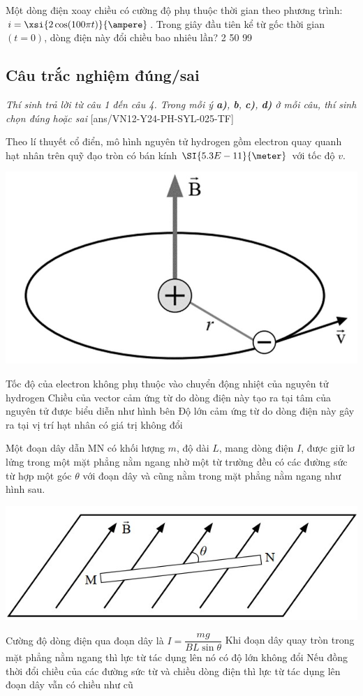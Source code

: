 \begin{ex}
	Một dòng điện xoay chiều có cường độ phụ thuộc thời gian theo phương trình: $i=\xsi{2 \cos (100 \pi t)}{\ampere}$. Trong giây đầu tiên kể từ gốc thời gian $(t=0)$, dòng điện này đổi chiều bao nhiêu lần?
	\choice
	{2}
	{50}
	{}
	{99}
	\loigiai{}
\end{ex}

\subsection{Câu trắc nghiệm đúng/sai}
\textit{Thí sinh trả lời từ câu 1 đến câu 4. Trong mỗi ý \textbf{a)}, \textbf{b}, \textbf{c)}, \textbf{d)} ở mỗi câu, thí sinh chọn đúng hoặc sai}
\setcounter{ex}{0}
[ans/VN12-Y24-PH-SYL-025-TF]
\begin{ex}
	Theo lí thuyết cổ điển, mô hình nguyên tử hydrogen gồm electron quay quanh hạt nhân trên quỹ đạo tròn có bán kính $\SI{5.3E-11}{\meter}$ với tốc độ $v$.	
	\begin{center}
		\includegraphics[width=0.3\linewidth]{figs/VN12-Y24-PH-SYL-025P-10}
	\end{center}
	{\True Tốc độ của electron không phụ thuộc vào chuyển động nhiệt của nguyên tử hydrogen}
	{Chiều của vector cảm ứng từ do dòng điện này tạo ra tại tâm của nguyên tử được biểu diễn như hình bên}
	{\True Độ lớn cảm ứng từ do dòng điện này gây ra tại vị trí hạt nhân có giá trị không đổi}
	\loigiai{}
\end{ex}
\begin{ex}
	Một đoạn dây dẫn MN có khối lượng $m$, độ dài $L$, mang dòng điện $I$, được giữ lơ lửng trong một mặt phẳng nằm ngang nhờ một từ trường đều có các đường sức từ hợp một góc $\theta$ với đoạn dây và cũng nằm trong mặt phẳng nằm ngang như hình sau.
	\begin{center}
		\includegraphics[width=0.4\linewidth]{figs/VN12-Y24-PH-SYL-025P-11}
	\end{center}	
	{\True Cường độ dòng điện qua đoạn dây là $I=\dfrac{m g}{B L \sin \theta}$}
	{Khi đoạn dây quay tròn trong mặt phẳng nằm ngang thì lực từ tác dụng lên nó có độ lớn không đổi}
	{\True Nếu đồng thời đổi chiều của các đường sức từ và chiều dòng điện thì lực từ tác dụng lên đoạn dây vẫn có chiều như cũ}
	\loigiai{}
\end{ex}
